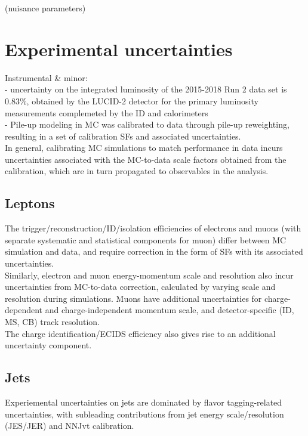 \documentclass[../thesis.tex]{subfiles}
\begin{document}
\vspace{-1\baselineskip}
(nuisance parameters)

\section{Experimental uncertainties}
\label{sec:sysexp}
Instrumental \& minor:\\
- uncertainty on the integrated luminosity of the 2015-2018 Run 2 data set is $0.83\%$, obtained by the LUCID-2 detector for the primary luminosity measurements complemeted by the ID and calorimeters\\
- Pile-up modeling in MC was calibrated to data through pile-up reweighting, resulting in a set of calibration SFs and associated uncertainties. \\
In general, calibrating MC simulations to match performance in data incurs uncertainties associated with the MC-to-data scale factors obtained from the calibration, which are in turn propagated to observables in the analysis.

\subsection{Leptons}
The trigger/reconstruction/ID/isolation efficiencies of electrons and muons (with separate systematic and statistical components for muon) differ between MC simulation and data, and require correction in the form of SFs with its  associated uncertainties.\\
Similarly, electron and muon energy-momentum scale and resolution also incur uncertainties from MC-to-data correction, calculated by varying scale and resolution during simulations. Muons have additional uncertainties for charge-dependent and charge-independent momentum scale, and detector-specific (ID, MS, CB) track resolution.\\
The charge identification/ECIDS efficiency also gives rise to an additional uncertainty component.\\

\subsection{Jets}
Experiemental uncertainties on jets are dominated by flavor tagging-related uncertainties, with subleading contributions from jet energy scale/resolution (JES/JER) and NNJvt calibration.\\
\end{document}
